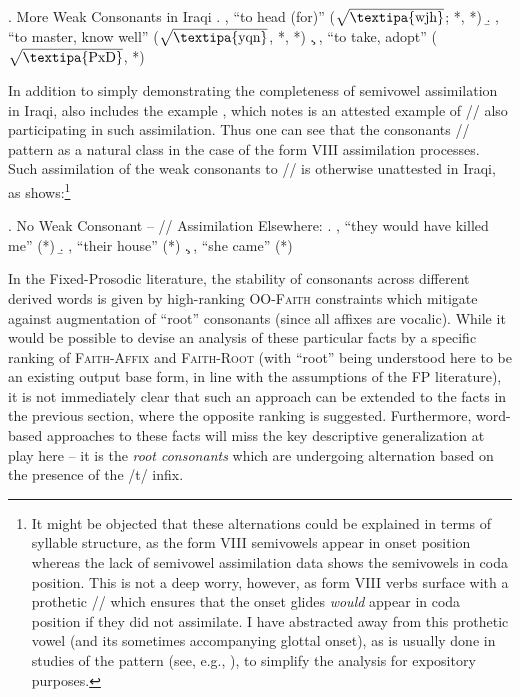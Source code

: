 \documentclass[12pt,twoside,letterpaper]{article}
\begin{document}
\ex. More Weak Consonants in Iraqi \citep[p.74]{erwin04}
\a. , ``to head (for)'' ($\sqrt{\textrm{\textipa{wjh}}}$; *, *)
\b. , ``to master, know well'' ($\sqrt{\textrm{\textipa{yqn}}}$, *, *)
\c. , ``to take, adopt'' ($\sqrt{\textrm{\textipa{PxD}}}$, *)

In addition to simply demonstrating the completeness of semivowel assimilation in Iraqi, \Last also includes the example \Last[c], which \cite{erwin04} notes is an attested example of // also participating in such assimilation. Thus one can see that the consonants // pattern as a natural class in the case of the form VIII assimilation processes. Such assimilation of the weak consonants to // is otherwise unattested in Iraqi, as \Next shows:\footnote{It might be objected that these alternations could be explained in terms of syllable structure, as the form VIII semivowels appear in onset position whereas the lack of semivowel assimilation data shows the semivowels in coda position. This is not a deep worry, however, as form VIII verbs surface with a prothetic // which ensures that the onset glides \emph{would} appear in coda position if they did not assimilate. I have abstracted away from this prothetic vowel (and its sometimes accompanying glottal onset), as is usually done in studies of the {\em {}} pattern (see, e.g., \cite{mccarthy93a,ussishkin00}), to simplify the analysis for expository purposes.}

\ex. No Weak Consonant -- // Assimilation Elsewhere:
\a. , ``they would have killed me'' (*)
\b. , ``their house'' (*)
\c. , ``she came'' (*)

In the Fixed-Prosodic literature, the stability of consonants across different derived words is given by high-ranking \textsc{OO-Faith} constraints which mitigate against augmentation of ``root'' consonants (since all affixes are vocalic). While it would be possible to devise an analysis of these particular facts by a specific ranking of \textsc{Faith-Affix} and \textsc{Faith-Root} (with ``root'' being understood here to be an existing output base form, in line with the assumptions of the FP literature), it is not immediately clear that such an approach can be extended to the facts in the previous section, where the opposite ranking is suggested. Furthermore, word-based approaches to these facts will miss the key descriptive generalization at play here -- it is the \emph{root consonants} which are undergoing alternation based on the presence of the /t/ infix.
\end{document}
